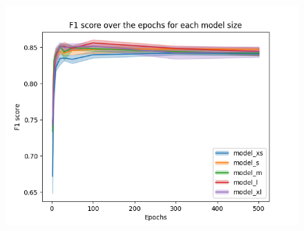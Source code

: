 \begin{figure}[!htbp]
    \centering
    \begin{minipage}[t]{.5\textwidth}%
      \centering
      \includegraphics[width=1.1\linewidth]{Figures/results/yolov8/f1_score_over_epochs_standard_sizes.png}
      \label{fig:yolov8_visulization_f1_score_standard_models}
    \end{minipage}%
\end{figure}

